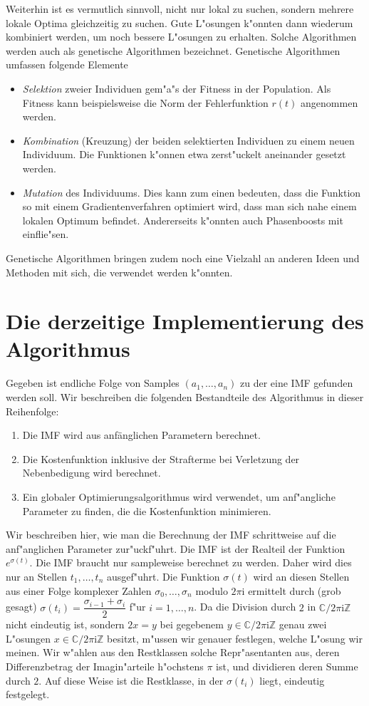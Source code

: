 \documentclass[a4paper]{scrartcl}
\newcommand{\C}{{\mathbb{C}}}
\newcommand{\Z}{{\mathbb{Z}}}
\newcommand{\ii}{{\mathrm{i}}}
\begin{document}
Weiterhin ist es vermutlich sinnvoll, nicht nur lokal zu suchen, sondern mehrere lokale Optima gleichzeitig zu suchen. 
Gute L"osungen k"onnten dann wiederum kombiniert werden, um noch bessere L"osungen zu erhalten. 
Solche Algorithmen werden auch als genetische Algorithmen bezeichnet. 
Genetische Algorithmen umfassen folgende Elemente
\begin{itemize}
  \item {\em Selektion} zweier Individuen gem"a"s der Fitness in der Population. 
  Als Fitness kann beispielsweise die Norm der Fehlerfunktion $r(t)$ angenommen werden.  
  \item {\em Kombination} (Kreuzung) der beiden selektierten Individuen zu einem neuen Individuum. 
  Die Funktionen k"onnen etwa zerst"uckelt aneinander gesetzt werden.
  \item {\em Mutation} des Individuums. 
  Dies kann zum einen bedeuten, dass die Funktion so mit einem Gradientenverfahren optimiert wird, dass man sich nahe einem lokalen Optimum befindet. 
  Andererseits k"onnten auch Phasenboosts mit einflie"sen. 
\end{itemize}
Genetische Algorithmen bringen zudem noch eine Vielzahl an anderen Ideen und Methoden mit sich, die verwendet werden k"onnten. 


\section{Die derzeitige Implementierung des Algorithmus}

Gegeben ist endliche Folge von Samples $(a_1,\ldots,a_n)$ zu der eine IMF gefunden werden soll. 
Wir beschreiben die folgenden Bestandteile des Algorithmus in dieser Reihenfolge:
\begin{enumerate}[1.]
  \item Die IMF wird aus anfänglichen Parametern berechnet. 
  \item Die Kostenfunktion inklusive der Strafterme bei Verletzung der Nebenbedigung wird berechnet. 
  \item Ein globaler Optimierungsalgorithmus wird verwendet, um anf"angliche Parameter zu finden, die die Kostenfunktion minimieren. 
\end{enumerate}

Wir beschreiben hier, wie man die Berechnung der IMF schrittweise auf die anf"anglichen Parameter zur"uckf"uhrt. 
Die IMF ist der Realteil der Funktion $e^{\sigma(t)}$. 
Die IMF braucht nur sampleweise berechnet zu werden. 
Daher wird dies nur an Stellen $t_1,\ldots,t_n$ ausgef"uhrt. 
Die Funktion $\sigma(t)$ wird an diesen Stellen aus einer Folge komplexer Zahlen $\sigma_0,\ldots,\sigma_n$ modulo $2\pi\ii$ ermittelt durch (grob gesagt) $\sigma(t_i)=\dfrac{\sigma_{i-1}+\sigma_{i}}{2}$ f"ur $i=1,\ldots,n$. 
Da die Division durch $2$ in $\C/2\pi\ii\Z$ nicht eindeutig ist, sondern $2x=y$ bei gegebenem $y\in\C/2\pi\ii\Z$ genau zwei L"osungen $x\in\C/2\pi\ii\Z$ besitzt, m"ussen wir genauer festlegen, welche L"osung wir meinen. 
Wir w"ahlen aus den Restklassen solche Repr"asentanten aus, deren Differenzbetrag der Imagin"arteile h"ochstens $\pi$ ist, und dividieren deren Summe durch $2$. 
Auf diese Weise ist die Restklasse, in der $\sigma(t_i)$ liegt, eindeutig festgelegt. 
\end{document}
